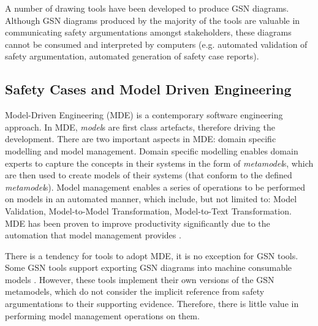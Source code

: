 A number of drawing tools have been developed \cite{asce, iscade, yorkgsn, certWare, astahGSN} to produce GSN diagrams. Although GSN diagrams produced by the majority of the tools are valuable in communicating safety argumentations amongst stakeholders, these diagrams cannot be consumed and interpreted by computers (e.g. automated validation of safety argumentation, automated generation of safety case reports). 


\subsection{Safety Cases and Model Driven Engineering}
Model-Driven Engineering (MDE) is a contemporary software engineering approach. In MDE, \textit{model}s are first class artefacts, therefore driving the development. There are two important aspects in MDE: domain specific modelling and model management. Domain specific modelling enables domain experts to capture the concepts in their systems in the form of \textit{metamodel}s, which are then used to create models of their systems (that conform to the defined \textit{metamodel}s). Model management enables a series of operations to be performed on models in an automated manner, which include, but not limited to: Model Validation, Model-to-Model Transformation, Model-to-Text Transformation. MDE has been proven to improve productivity significantly due to the automation that model management provides \cite{jaaksi2002developing, karna2009evaluating}. 

There is a tendency for tools to adopt MDE, it is no exception for GSN tools. Some GSN tools support exporting GSN diagrams into machine consumable models \cite{certWare, astahGSN}. However, these tools implement their own versions of the GSN metamodels, which do not consider the implicit reference from safety argumentations to their supporting evidence. Therefore, there is little value in performing model management operations on them.


%

